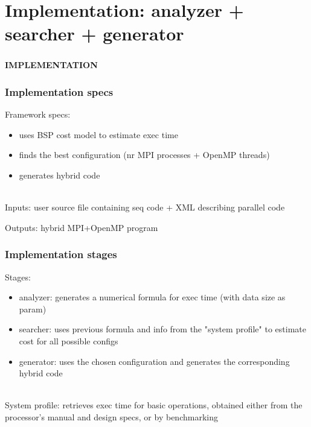 \documentclass{beamer}
\begin{document}




\section{Implementation: analyzer + searcher + generator}


\begin{frame}
\frametitle{}

\begin{center}\textbf{IMPLEMENTATION}\end{center}

\end{frame}

\begin{frame}
\frametitle{Implementation specs}

Framework specs:

\begin{itemize}

\item uses BSP cost model to estimate exec time
\item finds the best configuration (nr MPI processes + OpenMP threads)
\item generates hybrid code

\end{itemize}

\ \\

Inputs: user source file containing seq code + XML describing parallel code

Outputs: hybrid MPI+OpenMP program

\end{frame}



\begin{frame}
\frametitle{Implementation stages}

Stages: 

\begin{itemize}

\item analyzer: generates a numerical formula for exec time (with data size as param)
\item searcher: uses previous formula and info from the "system profile" to estimate cost for all possible configs
\item generator: uses the chosen configuration and generates the corresponding hybrid code

\end{itemize}

\ \\

System profile: retrieves exec time for basic operations, obtained either from the processor's manual and design specs, or by benchmarking

\end{frame}
\end{document}
